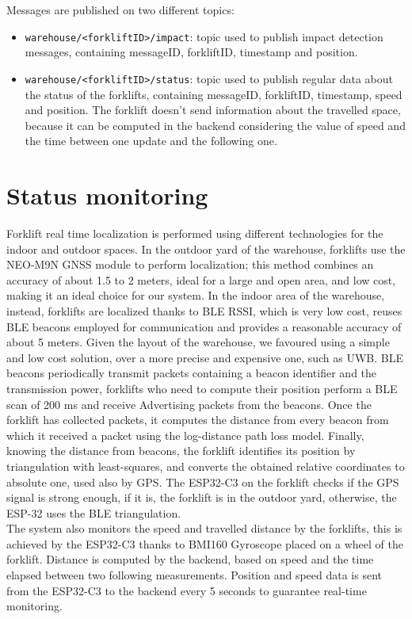 Messages are published on two different topics:
\begin{itemize}
\item \verb|warehouse/<forkliftID>/impact|: topic used to publish impact detection messages, containing messageID, forkliftID, timestamp and position.
\item \verb|warehouse/<forkliftID>/status|: topic used to publish regular data about the status of the forklifts, containing messageID, forkliftID, timestamp, speed and position.
The forklift doesn’t send information about the travelled space, because it can be computed in the backend considering the value of speed and the time between one update and the following one.
\end{itemize}

\section{Status monitoring}
Forklift real time localization is performed using different technologies for the indoor and outdoor spaces. In the outdoor yard of the warehouse, forklifts use the NEO-M9N GNSS module to perform localization; this method combines an accuracy of about 1.5 to 2 meters, ideal for a large and open area, and low cost, making it an ideal choice for our system. In the indoor area of the warehouse, instead, forklifts are localized thanks to BLE RSSI, which is very low cost, reuses BLE beacons employed for communication and provides a reasonable accuracy of about 5 meters. Given the layout of the warehouse, we favoured using a simple and low cost solution, over a more precise and expensive one, such as UWB. BLE beacons periodically transmit packets containing a beacon identifier and the transmission power, forklifts who need to compute their position perform a BLE scan of 200 ms and receive Advertising packets from the beacons. Once the forklift has collected packets, it computes the distance from every beacon from which it received a packet using the log-distance path loss model. Finally, knowing the distance from beacons, the forklift identifies its position by triangulation with least-squares, and converts the obtained relative coordinates to absolute one, used also by GPS. The ESP32-C3 on the forklift checks if the GPS signal is strong enough, if it is, the forklift is in the outdoor yard, otherwise, the ESP-32 uses the BLE triangulation.\\ 
The system also monitors the speed and travelled distance by the forklifts, this is achieved by the ESP32-C3 thanks to BMI160 Gyroscope placed on a wheel of the forklift. Distance is computed by the backend, based on speed and the time elapsed between two following measurements. Position and speed data is sent from the ESP32-C3 to the backend every 5 seconds to guarantee real-time monitoring.

